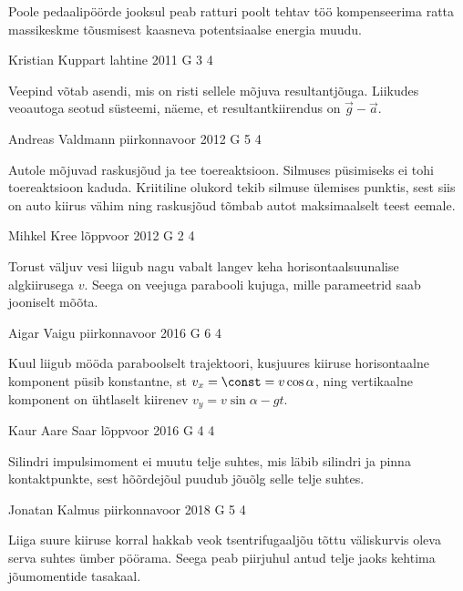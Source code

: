 \documentclass[11pt]{article}
\begin{document}
{{\ifHint
Poole pedaalipöörde jooksul peab ratturi poolt tehtav töö kompenseerima ratta massikeskme tõusmisest kaasneva potentsiaalse energia muudu.
\fi
}

{Kristian Kuppart} %
{lahtine} %
{2011} %
{G 3} %
{4} %
{

\ifHint
Veepind võtab asendi, mis on risti sellele mõjuva resultantjõuga. Liikudes veoautoga seotud süsteemi, näeme, et resultantkiirendus on $\vec g - \vec a$.
\fi
}

{Andreas Valdmann} %
{piirkonnavoor} %
{2012} %
{G 5} %
{4} %
{

\ifHint
Autole mõjuvad raskusjõud ja tee toereaktsioon. Silmuses püsimiseks ei tohi toereaktsioon kaduda. Kriitiline olukord tekib silmuse ülemises punktis, sest siis on auto kiirus vähim ning raskusjõud tõmbab autot maksimaalselt teest eemale.
\fi
}

{Mihkel Kree} %
{lõppvoor} %
{2012} %
{G 2} %
{4} %
{

\ifHint
Torust väljuv vesi liigub nagu vabalt langev keha horisontaalsuunalise algkiirusega $v$. Seega on veejuga parabooli kujuga, mille parameetrid saab jooniselt mõõta.
\fi
}

{Aigar Vaigu} %
{piirkonnavoor} %
{2016} %
{G 6} %
{4} %
{

\ifHint
Kuul liigub mööda paraboolselt trajektoori, kusjuures kiiruse horisontaalne komponent püsib konstantne, st $v_x = \const = v\cos\alpha$, ning vertikaalne komponent on ühtlaselt kiirenev $v_y = v\sin\alpha - gt$.
\fi
}

{Kaur Aare Saar} %
{lõppvoor} %
{2016} %
{G 4} %
{4} %
{

\ifHint
Silindri impulsimoment ei muutu telje suhtes, mis läbib silindri ja pinna kontaktpunkte, sest hõõrdejõul puudub jõuõlg selle telje suhtes.
\fi
}

{Jonatan Kalmus} %
{piirkonnavoor} %
{2018} %
{G 5} %
{4} %
{

\ifHint
Liiga suure kiiruse korral hakkab veok tsentrifugaaljõu tõttu väliskurvis oleva serva suhtes ümber pöörama. Seega peab piirjuhul antud telje jaoks kehtima jõumomentide tasakaal.
\fi
}

}
\end{document}
